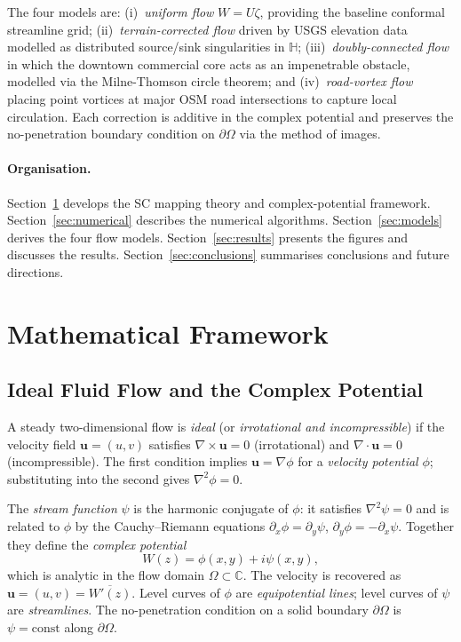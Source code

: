 \documentclass[11pt]{article}
\newcommand{\HH}{\mathbb{H}}          %
\newcommand{\CC}{\mathbb{C}}
\begin{document}
The four models are: (i)~\textit{uniform flow} $W=U\zeta$, providing the baseline
conformal streamline grid; (ii)~\textit{terrain-corrected flow} driven by USGS
elevation data modelled as distributed source/sink singularities in $\HH$;
(iii)~\textit{doubly-connected flow} in which the downtown commercial core acts
as an impenetrable obstacle, modelled via the Milne-Thomson circle theorem; and
(iv)~\textit{road-vortex flow} placing point vortices at major OSM road intersections
to capture local circulation. Each correction is additive in the complex potential
and preserves the no-penetration boundary condition on $\partial\Omega$ via the
method of images.

\paragraph{Organisation.}
Section~\ref{sec:theory} develops the SC mapping theory and complex-potential
framework. Section~\ref{sec:numerical} describes the numerical algorithms.
Section~\ref{sec:models} derives the four flow models. Section~\ref{sec:results}
presents the figures and discusses the results. Section~\ref{sec:conclusions}
summarises conclusions and future directions.

\section{Mathematical Framework}
\label{sec:theory}

\subsection{Ideal Fluid Flow and the Complex Potential}

A steady two-dimensional flow is \emph{ideal} (or \emph{irrotational and
incompressible}) if the velocity field $\mathbf{u}=(u,v)$ satisfies
$\nabla\times\mathbf{u}=0$ (irrotational) and $\nabla\cdot\mathbf{u}=0$
(incompressible). The first condition implies $\mathbf{u}=\nabla\phi$ for a
\emph{velocity potential} $\phi$; substituting into the second gives
$\nabla^2\phi=0$.

The \emph{stream function} $\psi$ is the harmonic conjugate of $\phi$: it
satisfies $\nabla^2\psi=0$ and is related to $\phi$ by the Cauchy--Riemann
equations $\partial_x\phi=\partial_y\psi$, $\partial_y\phi=-\partial_x\psi$.
Together they define the \emph{complex potential}
\begin{equation}
  W(z) = \phi(x,y) + i\psi(x,y),
  \label{eq:W}
\end{equation}
which is analytic in the flow domain $\Omega\subset\CC$. The velocity is
recovered as $\mathbf{u}=(u,v)=\overline{W'(z)}$. Level curves of $\phi$
are \emph{equipotential lines}; level curves of $\psi$ are
\emph{streamlines}. The no-penetration condition on a solid boundary
$\partial\Omega$ is $\psi=\mathrm{const}$ along $\partial\Omega$.
\end{document}
